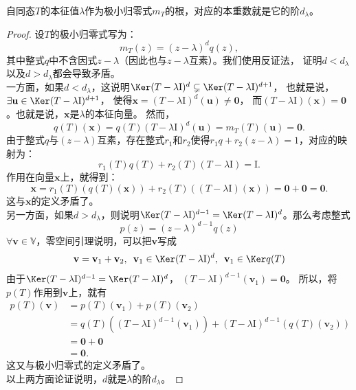 \documentclass[12pt,UTF8]{ctexbook}
\begin{document}
\begin{pp}\label{pp:6_12_5}
    自同态$T$的本征值$\lambda$作为极小归零式$m_T$的根，对应的本重数就是它的阶$d_\lambda$。
\end{pp}
\begin{proof} %
设$T$的极小归零式写为：
$$ m_T(z) = (z - \lambda)^d q(z),$$
其中整式$q$中不含因式$z - \lambda$（因此也与$z - \lambda$互素）。我们使用反证法，
证明$d < d_{\lambda}$以及$d > d_{\lambda}$都会导致矛盾。\\
一方面，如果$d < d_{\lambda}$，这说明$\Ker (T - \lambda\mathrm{I})^{d} \subsetneq \Ker (T - \lambda\mathrm{I})^{d+1}$，
也就是说，$\exists \mathbf{u}\in \Ker (T - \lambda\mathrm{I})^{d+1}$，
使得$\mathbf{x} = (T - \lambda\mathrm{I})^{d}(\mathbf{u}) \neq \mathbf{0}$，
而$(T - \lambda\mathrm{I})(\mathbf{x}) = \mathbf{0}$。也就是说，$\mathbf{x}$是$\lambda$的本征向量。
然而，
$$q(T)(\mathbf{x}) = q(T)(T - \lambda\mathrm{I})^{d}(\mathbf{u}) = m_T(T)(\mathbf{u}) = \mathbf{0}.$$ 
由于整式$q$与$(z - \lambda)$互素，存在整式$r_1$和$r_2$使得$r_1 q + r_2 (z - \lambda) = 1$，对应的映射为：
$$ r_1(T) q(T) + r_2(T) (T - \lambda \mathrm{I}) = \mathrm{I}. $$
作用在向量$\mathbf{x}$上，就得到：
$$ \mathbf{x} = r_1(T) (q(T)(\mathbf{x})) + r_2(T)((T - \lambda \mathrm{I})(\mathbf{x})) = \mathbf{0} + \mathbf{0} = \mathbf{0}. $$
这与$\mathbf{x}$的定义矛盾了。 \\
另一方面，如果$d > d_{\lambda}$，则说明$\Ker (T - \lambda\mathrm{I})^{d - 1} = \Ker (T - \lambda\mathrm{I})^{d}$。那么考虑整式
$$p(z) = (z - \lambda)^{d-1} q(z)$$
$\forall \mathbf{v} \in \mathbb{V}$，零空间引理说明，可以把$\mathbf{v}$写成
$$\mathbf{v} = \mathbf{v}_1 + \mathbf{v}_2, \,\,\, \mathbf{v}_1 \in \Ker (T - \lambda\mathrm{I})^{d}, \,\,\, \mathbf{v}_1 \in \Ker q(T) $$
由于$\Ker (T - \lambda\mathrm{I})^{d- 1} = \Ker (T - \lambda\mathrm{I})^{d}$，
$(T - \lambda\mathrm{I})^{d- 1}(\mathbf{v}_1) = \mathbf{0}$。
所以，将$p(T)$作用到$\mathbf{v}$上，就有
\begin{align*} 
    p(T)(\mathbf{v}) &= p(T)(\mathbf{v}_1) + p(T)(\mathbf{v}_2)  \\
    &= q(T)((T - \lambda\mathrm{I})^{d- 1}(\mathbf{v}_1)) + (T - \lambda\mathrm{I})^{d- 1}(q(T)(\mathbf{v}_2))  \\
    &= \mathbf{0} + \mathbf{0}  \\
    &= \mathbf{0}. 
\end{align*}
这又与极小归零式的定义矛盾了。\\
以上两方面论证说明，$d$就是$\lambda$的阶$d_{\lambda}$。

\end{proof}
\end{document}
